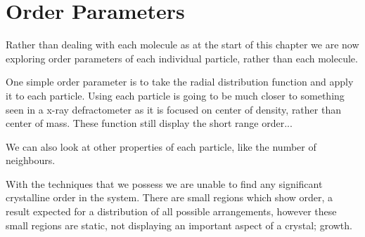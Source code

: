 \section{Order Parameters}


Rather than dealing with each molecule as at the start of this chapter we are now exploring order parameters of each individual particle, rather than each molecule.

One simple order parameter is to take the radial distribution function and apply it to each particle. Using each particle is going to be much closer to something seen in a x-ray defractometer as it is focused on center of density, rather than center of mass. These function still display the short range order...


We can also look at other properties of each particle, like the number of neighbours.

With the techniques that we possess we are unable to find any significant crystalline order in the system. There are small regions which show order, a result expected for a distribution of all possible arrangements, however these small regions are static, not displaying an important aspect of a crystal; growth.



